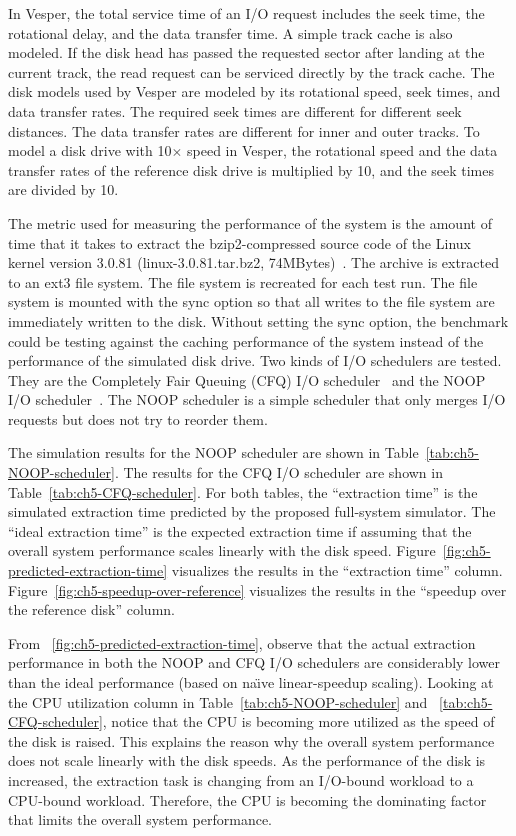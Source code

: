In Vesper, the total service time of an I/O request includes the seek time, the rotational delay, and the data transfer time. A simple track cache is also modeled. If the disk head has passed the requested sector after landing at the current track, the read request can be serviced directly by the track cache. The disk models used by Vesper are modeled by its rotational speed, seek times, and data transfer rates. The required seek times are different for different seek distances. The data transfer rates are different for inner and outer tracks. To model a disk drive with 10$\times$ speed in Vesper, the rotational speed and the data transfer rates of the reference disk drive is multiplied by 10, and the seek times are divided by 10.

The metric used for measuring the performance of the system is the amount of time that it takes to extract the bzip2-compressed source code of the Linux kernel version 3.0.81 (linux-3.0.81.tar.bz2, 74MBytes)~\cite{Kernel:2013}. The archive is extracted to an ext3 file system. The file system is recreated for each test run. The file system is mounted with the sync option so that all writes to the file system are immediately written to the disk. Without setting the sync option, the benchmark could be testing against the caching performance of the system instead of the performance of the simulated disk drive. Two kinds of I/O schedulers are tested. They are the Completely Fair Queuing (CFQ) I/O scheduler~\cite{wiki:2013:CFQ} and the NOOP I/O scheduler~\cite{wiki:2015:NOOP}. The NOOP scheduler is a simple scheduler that only merges I/O requests but does not try to reorder them.

The simulation results for the NOOP scheduler are shown in Table~\ref{tab:ch5-NOOP-scheduler}. The results for the CFQ I/O scheduler are shown in Table~\ref{tab:ch5-CFQ-scheduler}. For both tables, the ``extraction time'' is the simulated extraction time predicted by the proposed full-system simulator. The ``ideal extraction time'' is the expected extraction time if assuming that the overall system performance scales linearly with the disk speed. Figure~\ref{fig:ch5-predicted-extraction-time} visualizes the results in the ``extraction time'' column. Figure~\ref{fig:ch5-speedup-over-reference} visualizes the results in the ``speedup over the reference disk'' column.

From ~\ref{fig:ch5-predicted-extraction-time}, observe that the actual extraction performance in both the NOOP and CFQ I/O schedulers are considerably lower than the ideal performance (based on na\"{\i}ve linear-speedup scaling). Looking at the CPU utilization column in Table~\ref{tab:ch5-NOOP-scheduler} and ~\ref{tab:ch5-CFQ-scheduler}, notice that the CPU is becoming more utilized as the speed of the disk is raised. This explains the reason why the overall system performance does not scale linearly with the disk speeds. As the performance of the disk is increased, the extraction task is changing from an I/O-bound workload to a CPU-bound workload. Therefore, the CPU is becoming the dominating factor that limits the overall system performance.

